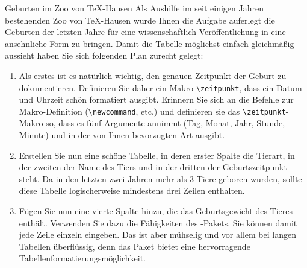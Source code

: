 \documentclass[
	vorläufig=false, 
	blattnr=3,
	ausgabe=2022-10-26,
	abgabe=2022-11-09,
	lösung=true,
	shortverb,
]{../tex/latexkurs-exercise}
\begin{document}
\begin{aufgabe}[6 (+4 Bonus)]{Geburten im Zoo von \TeX -Hausen}
    Als Aushilfe im seit einigen Jahren bestehenden Zoo von \TeX -Hausen wurde Ihnen die Aufgabe auferlegt die Geburten der letzten Jahre für eine wissenschaftlich Veröffentlichung in eine ansehnliche Form zu bringen. Damit die Tabelle möglichst einfach gleichmäßig aussieht haben Sie sich folgenden Plan zurecht gelegt:
    \begin{enumerate}[label=\alph*)]
        \item Als erstes ist es natürlich wichtig, den genauen Zeitpunkt der Geburt zu dokumentieren. Definieren Sie daher ein Makro \texttt{\textbackslash zeitpunkt}, dass ein Datum und Uhrzeit schön formatiert ausgibt. Erinnern Sie sich an die Befehle zur Makro-Definition (\texttt{\textbackslash newcommand}, etc.) und definieren sie das \texttt{\textbackslash zeitpunkt}-Makro so, dass es fünf Argumente annimmt (Tag, Monat, Jahr, Stunde, Minute) und in der von Ihnen bevorzugten Art ausgibt.
        \item Erstellen Sie nun eine schöne Tabelle, in deren erster Spalte die Tierart, in der zweiten der Name des Tiers und in der dritten der Geburtszeitpunkt steht. Da in den letzten zwei Jahren mehr als 3 Tiere geboren wurden, sollte diese Tabelle logischerweise mindestens drei Zeilen enthalten.
        \item Fügen Sie nun eine vierte Spalte hinzu, die das Geburtsgewicht des Tieres enthält. Verwenden Sie dazu die Fähigkeiten des -Pakets. Sie können damit jede Zeile einzeln eingeben. Das ist aber mühselig und vor allem bei langen Tabellen überflüssig, denn das Paket bietet eine hervorragende Tabellenformatierungsmöglichkeit.


\end{enumerate}
\end{aufgabe}
\end{document}
